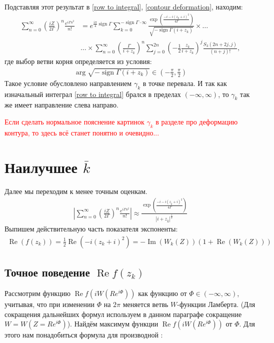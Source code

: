 \documentclass[a4paper, 12pt]{article}
\DeclareMathOperator*{\sign}{sign}
\DeclareMathOperator*{\Real}{Re}
\DeclareMathOperator*{\Imag}{Im}
\newenvironment{eqw}{\begin{equation} \begin{aligned}}   
    {\end{aligned}    \end{equation}}
\begin{document}
Подставляя этот результат в \eqref{row to integral}, \eqref{contour deformation}, находим:
\begin{eqw}
    \sum\limits_{n=0}^{\infty}\left(\frac{iZ}{2\Gamma}\right)^n  \frac{e^{i\Gamma n^2}}{n!} &= e^{\frac{i\pi}{4}\sign\Gamma}
    \sum\limits_{k=0}^{-\sign\Gamma\cdot\infty} \frac{\exp\left(\frac{-i-i(z_k+i)^2}{4\Gamma}\right)}{\sqrt{-\sign \Gamma\left(i+z_k\right)}}
    \times\dots\\
    &\dots\times
    \sum\limits_{n=0}^{\infty}\left(\frac{\Gamma}{i+z_k}\right)^n
    \sum\limits_{j=0}^{2n}\left(-\frac{1}{2}\frac{z_k}{i+z_k}\right)^{j}\frac{S_3(2n+2j, j)}{(n+j)!},
\end{eqw}
где выбор ветви корня определяется из условия:
\begin{eqw}
    \arg\sqrt{-\sign \Gamma\left(i+z_k\right)} \in \left(-\frac{\pi}{2}, \frac{\pi}{2}\right)
\end{eqw}
Такое условие обусловлено направлением $\gamma_k$ в точке перевала. И так как изначальный интеграл \eqref{row to integral} брался в пределах $(-\infty, \infty)$, то $\gamma_k$ так же имеет направление слева направо. 

\textcolor{red}{Если сделать нормальное пояснение картинок $\gamma_k$ в разделе про деформацию контура, то здесь всё станет понятно и очевидно...}


\section*{Наилучшее $\bar k$}
Далее мы переходим к менее точным оценкам.
\begin{eqw}\label{approx_exact_row}
    \left|\sum\limits_{n=0}^{\infty}\left(\frac{iZ}{2\Gamma}\right)^n  \frac{e^{i\Gamma n^2}}{n!} \right|\approx 
    \frac{\exp\left(\frac{-i-i(z_{\bar k}+i)^2}{4\Gamma}\right)}{\left|i+z_{\bar k}\right|^{\frac{1}{2}}}
\end{eqw}
Выпишем действительную часть показателя экспоненты:
\begin{eqw}\label{real f z k through W}
    \Real\left(f(z_k)\right) = \frac{1}{2}\Real\left(-i(z_k+i)^2\right) = -\Imag(W_k(Z))\left(1+\Real(W_k(Z))\right)
\end{eqw}
\subsection*{Точное поведение $\Real f(z_k)$}
Рассмотрим функцию $\Real f(iW(R e^{i\Phi}))$ как функцию от $\Phi\in(-\infty, \infty)$, учитывая, что при изменении $\Phi$ на $2\pi$ меняется ветвь $W$-функции Ламберта. (Для сокращения дальнейших формул используем в данном параграфе сокращение $W = W(Z=R e^{i\Phi})$). Найдём максимум функции $\Real f(iW(R e^{i\Phi}))$ от $\Phi$.  Для этого нам понадобиться формула для производной \cite[formula 3.2]{corless1996lambertw}:
\end{document}
